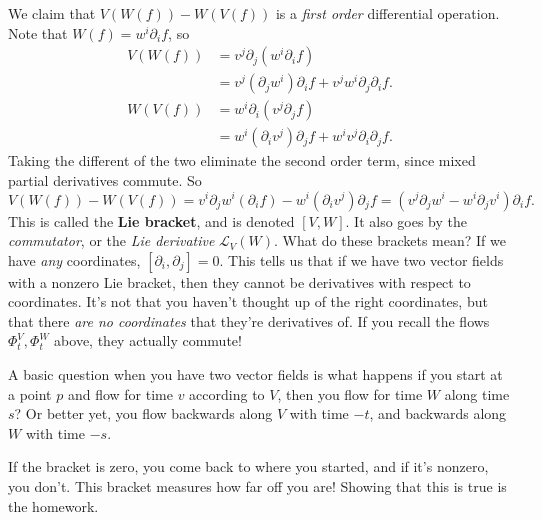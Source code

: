 We claim that $V(W(f))-W(V(f))$ is a \emph{first order} differential operation. Note that $W(f)=w^i \partial _i f$, so 
\begin{align*}
    V(W(f))&=v^j \partial _j (w^i \partial _i f)\\
           &=v^j (\partial _j w^i )\partial _i f+v^j w^i \partial _j \partial _i f.\\
    W(V(f))&=w^i \partial _i (v^j \partial _j f)\\
           &=w^i (\partial _i v^j )\partial _j f+w^i v^j \partial _i \partial _j f.
\end{align*}Taking the different of the two eliminate the second order term, since mixed partial derivatives commute. So \[
V(W(f))-W(V(f))=v^i \partial _j w^i (\partial _i f)-w^i (\partial _i v^j )\partial _j f=(v^j \partial _j w^i -w^i \partial _j v^i )\partial _i f.
\] This is called the \textbf{Lie bracket}, and is denoted $[V,W]$. It also goes by the \emph{commutator}, or the \emph{Lie derivative} $\mathcal{L} _V(W)$. What do these brackets mean? If we have \emph{any} coordinates, $[\partial _i ,\partial _j ]=0$. This tells us that if we have two vector fields with a nonzero Lie bracket, then they cannot be derivatives with respect to coordinates. It's not that you haven't thought up of the right coordinates, but that there \emph{are no coordinates} that they're derivatives of. If you recall the flows $\Phi^V_t,\Phi^W_t$ above, they actually commute!

A basic question when you have two vector fields is what happens if you start at a point $p$ and flow for time $v$ according to $V$, then you flow for time $W$ along time $s$? Or better yet, you flow backwards along $V$ with time $-t$, and backwards along $W$ with time $-s$. 
\begin{figure}[H]
\centering
{}
\end{figure}
If the bracket is zero, you come back to where you started, and if it's nonzero, you don't. This bracket measures how far off you are! Showing that this is true is the homework.

